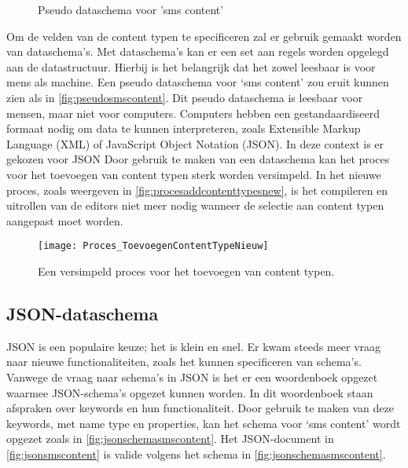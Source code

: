 \begin{wrapfigure}{r}{0.5\textwidth}
    \caption{Pseudo dataschema voor 'sms content'}
    \label{fig:pseudosmscontent}
\end{wrapfigure}

\pagebreak
\noindent Om de velden van de content typen te specificeren zal er gebruik gemaakt worden van dataschema’s. Met dataschema’s kan er een set aan regels worden opgelegd aan de datastructuur. Hierbij is het belangrijk dat het zowel leesbaar is voor mens als machine. Een pseudo dataschema voor ‘sms content’ zou eruit kunnen zien als in \autoref{fig:pseudosmscontent}.
Dit pseudo dataschema is leesbaar voor mensen, maar niet voor computers. Computers hebben een gestandaardiseerd formaat nodig om data te kunnen interpreteren, zoals Extensible Markup Language (XML) of JavaScript Object Notation (JSON). In deze context is er gekozen voor JSON
Door gebruik te maken van een dataschema kan het proces voor het toevoegen van content typen sterk worden versimpeld. In het nieuwe proces, zoals weergeven in \autoref{fig:procesaddcontenttypesnew}, is het compileren en uitrollen van de editors niet meer nodig wanneer de selectie aan content typen aangepast moet worden.

\begin{figure}[htb]
    \centering
    \texttt{[image: Proces\_ToevoegenContentTypeNieuw]}
    \caption{Een versimpeld proces voor het toevoegen van content typen.}
    \label{fig:procesaddcontenttypesnew}
\end{figure}

\pagebreak
\subsection{JSON-dataschema}
JSON is een populaire keuze; het is klein en snel. Er kwam steeds meer vraag naar nieuwe functionaliteiten, zoals het kunnen specificeren van schema’s\cite{Severance2012}. 
Vanwege de vraag naar schema’s in JSON is het er een woordenboek opgezet waarmee JSON-schema’s opgezet kunnen worden\cite{JsonSchemaOrg}. In dit woordenboek staan afspraken over keywords en hun functionaliteit. Door gebruik te maken van deze keywords, met name type en properties, kan het schema voor ‘sms content’ wordt opgezet zoals in \autoref{fig:jsonschemasmscontent}. Het JSON-document in \autoref{fig:jsonsmscontent} is valide volgens het schema in \autoref{fig:jsonschemasmscontent}.

